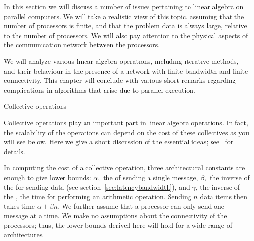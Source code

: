 
In this section we will discuss  a number of issues pertaining to
linear algebra on parallel computers. We will take a realistic view of
this topic, assuming that the number of processors is finite, and that
the problem data is always large, relative to the number of
processors. We will also pay attention to the physical aspects of the
communication network between the processors. 

We will analyze various linear algebra operations, including iterative
methods, and their behaviour in the presence of a network with finite
bandwidth and finite connectivity. This chapter will conclude with
various short remarks regarding complications in algorithms that arise
due to parallel execution.

 {Collective operations}
\label{sec:collective}
\label{sec:collective-cost}

Collective operations play an important part in linear algebra
operations. In fact, the scalability of the operations can depend on
the cost of these collectives as you will see below.  Here we give a
short discussion of the essential ideas; see~\cite{Chan2007Collective}
for details.


In computing the cost of a collective operation, three architectural
constants are enough to give lower bounds: $\alpha$,~the  of
sending a single message, $\beta$,~the inverse of the  for
sending data (see section~\ref{sec:latencybandwidth}), and $\gamma$,
the inverse of the , the
time for performing an arithmetic operation. Sending $n$ data
items then takes time $\alpha +\beta n$. We further assume that a
processor can only send one message at a time. We make no assumptions
about the connectivity of the processors; thus, the lower bounds
derived here will hold for a wide range of architectures.

